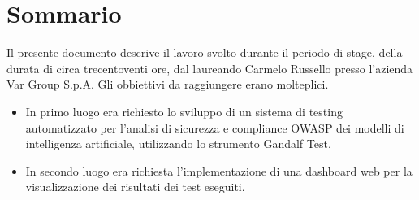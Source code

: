 \cleardoublepage
{}
{}
\begingroup
\let\clearpage\relax
\let\cleardoublepage\relax
\let\cleardoublepage\relax

\chapter*{Sommario}

Il presente documento descrive il lavoro svolto durante il periodo di stage, della durata di circa trecentoventi ore, dal laureando Carmelo Russello presso l'azienda Var Group S.p.A.
Gli obbiettivi da raggiungere erano molteplici.\\
\begin{itemize}
\item In primo luogo era richiesto lo sviluppo di un sistema di testing automatizzato per l'analisi di sicurezza e compliance OWASP dei modelli di intelligenza artificiale, utilizzando lo strumento Gandalf Test.
\item In secondo luogo era richiesta l'implementazione di una dashboard web per la visualizzazione dei risultati dei test eseguiti.
\end{itemize}




\endgroup

\vfill
